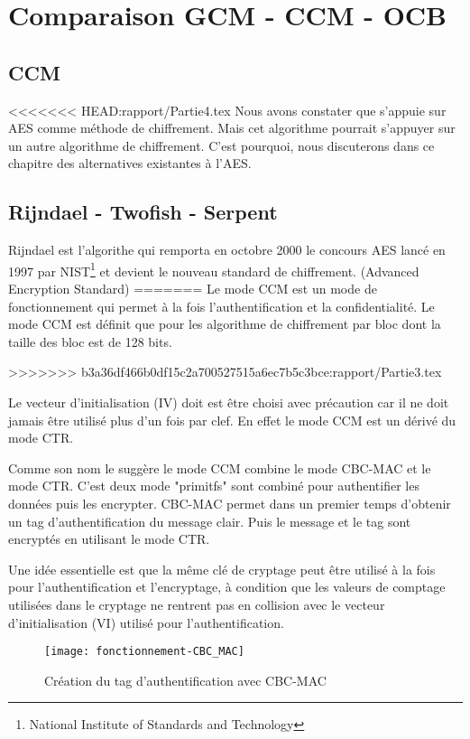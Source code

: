 \chapter{Comparaison GCM - CCM - OCB}

\section{CCM}

<<<<<<< HEAD:rapport/Partie4.tex
Nous avons constater que \aes s'appuie sur AES comme méthode de chiffrement. Mais cet algorithme pourrait s'appuyer sur un autre algorithme de chiffrement. C'est pourquoi, nous discuterons dans ce chapitre des alternatives existantes à l'AES.

\section{Rijndael - Twofish - Serpent}
Rijndael est l'algorithe qui remporta en octobre 2000 le concours AES lancé en 1997 par NIST\footnote{National Institute of Standards and Technology} et devient le nouveau standard de chiffrement. (Advanced Encryption Standard)
=======
Le mode CCM est un mode de fonctionnement qui permet à la fois l'authentification et la confidentialité. Le mode CCM est définit que pour les algorithme de chiffrement par bloc dont la taille des bloc est de 128 bits.

>>>>>>> b3a36df466b0df15c2a700527515a6ec7b5c3bce:rapport/Partie3.tex

Le vecteur d'initialisation (IV) doit est être choisi avec précaution car il ne doit jamais être utilisé plus d'un fois par clef. En effet le mode CCM est un dérivé du mode CTR.


Comme son nom le suggère le mode CCM combine le mode CBC-MAC et le mode CTR. C'est deux mode "primitfs" sont combiné pour authentifier les données puis les encrypter. CBC-MAC permet dans un premier temps d'obtenir un tag d'authentification du message clair. Puis le message et le tag sont encryptés en utilisant le mode CTR.


Une idée essentielle est que la même clé de cryptage peut être utilisé à la fois pour l'authentification et l'encryptage, à condition que les valeurs de comptage utilisées dans le cryptage ne rentrent pas en collision avec le vecteur d'initialisation (VI) utilisé pour l'authentification.


\begin{figure}[!h]
  \centering
  \texttt{[image: fonctionnement-CBC\_MAC]}
  \caption{Création du tag d'authentification avec CBC-MAC}
  \label{Création du tag d'authentification avec CBC-MAC}
\end{figure}

